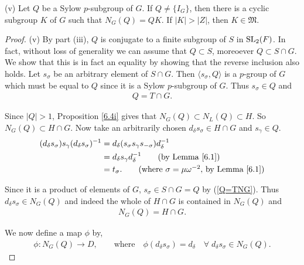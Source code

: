 \begin{theorem}
  \label{MaximalAbelianSubgroup.exists_IsCyclic_K_normalizer_eq_Q_join_K}
  
(v) Let $Q$ be a Sylow $p$-subgroup of $G$. If $Q \neq \{I_G\}$, then there is a cyclic subgroup $K$ of $G$ such that $N_G(Q) = QK$. If $|K| > |Z|$, then $K \in \mathfrak{M}$. \\
\end{theorem}

\begin{proof} 
(v) By part (iii), $Q$ is conjugate to a finite subgroup of $S$ in $\operatorname{SL}_2(F)$. In fact, without loss of generality we can assume that $Q \subset S$, moreoever $Q \subset S \cap G$. We show that this is in fact an equality by showing that the reverse inclusion also holds. 
Let $s_\sigma$ be an arbitrary element of $S \cap G$. Then $\langle s_\sigma, Q \rangle$ is a $p$-group of $G$ which must be equal to $Q$ since it is a Sylow $p$-subgroup of $G$. Thus $s_\sigma \in Q$ and
\begin{align}\label{Q=TNG} Q = T \cap G.
\end{align}

Since $|Q| > 1$, Proposition \ref{6.4i} gives that $N_G(Q) \subset N_L(Q) \subset H$. So $N_G(Q) \subset H \cap G$. Now take an arbitrarily chosen $d_\delta s_\sigma \in H \cap G$ and $s_\gamma \in Q$.
\begin{align*} (d_\delta s_\sigma) s_\gamma (d_\delta s_\sigma)^{-1} &= d_\delta ( s_\sigma s_\gamma  s_{-\sigma}) d^{-1}_\delta
\\ &=  d_\delta s_\gamma d^{-1}_\delta \tag{by Lemma \ref{6.1}}
\\ &= t_\sigma. \tag{where $\sigma = \mu \omega^{-2}$, by Lemma \ref{6.1}}
\end{align*}

Since it is a product of elements of $G$, $s_\sigma \in S \cap G = Q$ by (\ref{Q=TNG}). Thus $d_\delta s_\sigma \in N_G(Q)$ and indeed the whole of $H \cap G$ is contained in $N_G(Q)$ and
\begin{align}\label{normQ=HNG} N_G(Q) = H \cap G.
\end{align}

We now define a map $\phi$ by,
\begin{align*} \phi : N_G(Q) \longrightarrow D, \qquad \text{where} \quad \! \phi(d_\delta s_\sigma) = d_\delta \quad \forall \; d_\delta s_\sigma \in N_G(Q).
\end{align*}


\end{proof}
